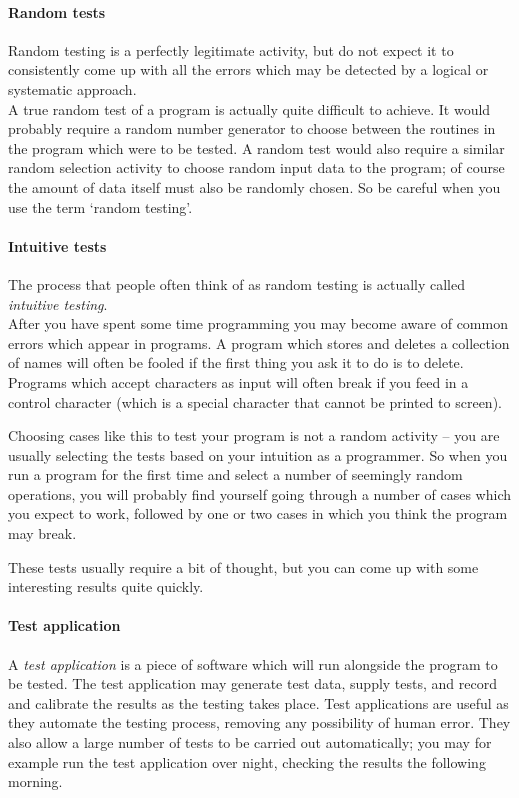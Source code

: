 \paragraph{Random tests} Random testing is a perfectly legitimate activity, but do not expect it to 
consistently come up with all the errors which may be detected by a logical or
systematic approach. \\

A true random test of a program is actually quite difficult to 
achieve. It would probably require a random number generator to 
choose between the routines in the program which were to be  
tested. A random test would also require a similar random 
selection activity to choose random input data to the program;
of course the amount of data itself must also be randomly chosen.
So be careful when you use the term `random testing'.
 
\paragraph{Intuitive tests} The process that people often think of as random testing is actually called {\it intuitive testing}. \\

After you have spent some time programming you may become aware of common
errors which appear in programs. A program which stores and deletes a 
collection of names will often be fooled if the first thing you ask it to 
do is to delete. Programs which accept characters as input will often break 
if you feed in a control character (which is a special character that cannot be printed
to screen).

Choosing cases like this to test your program is not a random 
activity -- you are usually selecting the tests based on your 
intuition as a programmer. So when you run a program for the 
first time and select a number of seemingly random operations, 
you will probably find yourself going through a number of cases
which you expect to work, followed by one or two cases in which 
you think the program may break. 

These tests usually require a bit of 
thought, but you can come up with some interesting results quite quickly. 
 

\paragraph{Test application} A {\em test application} is a piece of software which will run alongside the program to be tested. The test application may 
generate test data, supply tests, and record and calibrate the 
results as the testing takes place. Test applications are useful as they automate 
the testing process, removing any possibility of human error.
They also allow a large number of tests to be carried out 
automatically; you may for example run the test application over night, checking the 
results the following morning. \\

